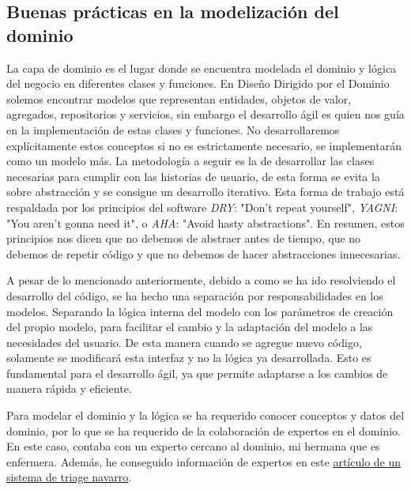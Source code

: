 \subsection{Buenas prácticas en la modelización del dominio}
La capa de dominio es el lugar donde se encuentra modelada el dominio y lógica del negocio en diferentes clases y funciones.
En Diseño Dirigido por el Dominio solemos encontrar modelos que representan entidades, objetos de valor, agregados, repositorios y servicios, sin embargo
el desarrollo ágil es quien nos guía en la implementación de estas clases y funciones. No desarrollaremos explícitamente estos conceptos si no es estrictamente necesario, se implementarán como un modelo más.
La metodología a seguir es la de desarrollar las clases necesarias para cumplir con las historias de usuario, de esta forma se evita la sobre abstracción y se consigue un desarrollo iterativo.
Esta forma de trabajo está respaldada por los principios del software \textit{DRY}: "Don't repeat yourself", \textit{YAGNI}: "You aren't gonna need it", o \textit{AHA}: "Avoid hasty abstractions".
En resumen, estos principios nos dicen que no debemos de abstraer antes de tiempo, que no debemos de repetir código y que no debemos de hacer abstracciones innecesarias.

A pesar de lo mencionado anteriormente, debido a como se ha ido resolviendo el desarrollo  del código, se ha hecho una separación por responsabilidades en los modelos.
Separando la lógica interna del modelo con los parámetros de creación del propio modelo, para facilitar el cambio y la adaptación del modelo a las necesidades del usuario.
De esta manera cuando se agregue nuevo código, solamente se modificará esta interfaz y no la lógica ya desarrollada.
Esto es fundamental para el desarrollo ágil, ya que permite adaptarse a los cambios de manera rápida y eficiente.

Para modelar el dominio y la lógica se ha requerido conocer conceptos y datos del dominio, por lo que se ha requerido de la colaboración de expertos en el dominio.
En este caso, contaba con un experto cercano al dominio, mi hermana que es enfermera. Además, he conseguido información de expertos en este \href{https://scielo.isciii.es/scielo.php?script=sci_arttext&pid=S1137-66272010000200008}{artículo de un sistema de triage navarro}.


